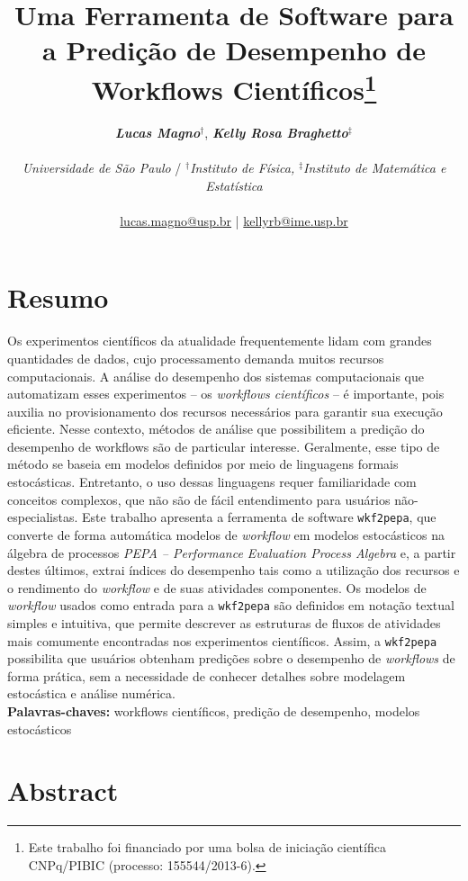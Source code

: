 \documentclass[a4paper,10pt]{article}
\date{}
\title{
    Uma Ferramenta de Software para a Predição de Desempenho de Workflows Científicos\footnote{Este trabalho foi financiado por uma bolsa de iniciação científica CNPq/PIBIC (processo: 155544/2013-6).}
}
\author{
\textbf{\textit{Lucas Magno}}$^\dagger$,\textbf{ \textit{Kelly Rosa Braghetto}}$^\ddagger$\\
\\
\textit{Universidade de São Paulo} / $^\dagger$\textit{Instituto de Física,} $^\ddagger$\textit{Instituto de Matemática e Estatística}\\
\\
\href{mailto:lucas.magno@usp.br}{lucas.magno@usp.br} | \href{mailto:kellyrb@ime.usp.br}{kellyrb@ime.usp.br}
}
\begin{document}
\parindent=0mm 

    \maketitle

\vspace{-0.5cm}    
    
    \section*{Resumo}

Os experimentos científicos da atualidade frequentemente lidam com grandes quantidades de dados, cujo processamento demanda muitos recursos computacionais. A análise do desempenho dos sistemas computacionais que automatizam esses experimentos -- os \textit{workflows científicos} -- é importante, pois auxilia no provisionamento dos recursos necessários para garantir sua execução eficiente. Nesse contexto, métodos de análise que possibilitem a predição do desempenho de workflows são de particular interesse. Geralmente, esse tipo de método se baseia em modelos definidos por meio de linguagens formais estocásticas. Entretanto, o uso dessas linguagens requer familiaridade com conceitos complexos, que não são de fácil entendimento para usuários não-especialistas. Este trabalho apresenta a ferramenta de software \texttt{wkf2pepa}, que converte de forma autom\'atica modelos de \emph{workflow} em modelos estocásticos na álgebra de processos \emph{PEPA -- Performance Evaluation Process Algebra} e, a partir destes \'ultimos, extrai índices do desempenho tais como a utilização dos recursos e o rendimento do \emph{workflow} e de suas atividades componentes. Os modelos de \emph{workflow} usados como entrada para a \texttt{wkf2pepa} são definidos em notaç\~ao textual simples e intuitiva, que permite descrever as estruturas de fluxos de atividades mais comumente encontradas nos experimentos cient\'ificos. Assim, a \texttt{wkf2pepa} possibilita que usuários obtenham predições sobre o desempenho de \emph{workflows} de forma prática, sem a necessidade de conhecer detalhes sobre modelagem estocástica e análise numérica.\\

\noindent \textbf{Palavras-chaves:} workflows científicos, predição de desempenho, modelos estocásticos
        
    \section*{Abstract}
\end{document}
